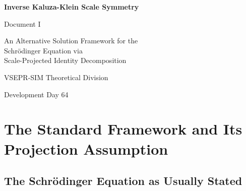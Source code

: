 \documentclass[11pt, a4paper, oneside]{article}
\theoremstyle{definition}
\theoremstyle{plain}
\theoremstyle{remark}
\begin{document}
\begin{titlepage}
  \centering
  \vspace*{2cm}
  {\Huge\bfseries Inverse Kaluza-Klein Scale Symmetry\par}
  \vspace{0.8cm}
  {\LARGE Document I\par}
  \vspace{0.5cm}
  {\Large An Alternative Solution Framework for the\\
  Schr\"{o}dinger Equation via\\
  Scale-Projected Identity Decomposition\par}
  \vspace{2cm}
  {\large VSEPR-SIM Theoretical Division\par}
  \vspace{0.4cm}
  {\large Development Day 64\par}
  \vspace{3cm}
  \begin{abstract}
	\noindent
	The standard Schr\"{o}dinger equation operates on a wavefunction
	$\Psi(\mathbf{r}, t)$ defined over classical 3D space plus time.
	This document proposes an alternative framework in which the wavefunction
	is reinterpreted as the \emph{scale-projected shadow} of a fuller
	identity structure $\mathcal{I}$ defined over an extended scale ladder
	$\{S_0, S_1, \ldots, S_D\}$.
	The standard solution is recovered at the $S_3$--$S_4$ projection;
	corrections at higher scales produce measurable residuals that map onto
	dark-sector and quantum-gravity phenomenology.
	The framework does not modify the Schr\"{o}dinger equation's algebra;
	it reinterprets what the wavefunction \emph{is} and why it succeeds and
	fails where it does.
  \end{abstract}
\end{titlepage}

\tableofcontents
\newpage

\section{The Standard Framework and Its Projection Assumption}

\subsection{The Schr\"{o}dinger Equation as Usually Stated}
\end{document}

